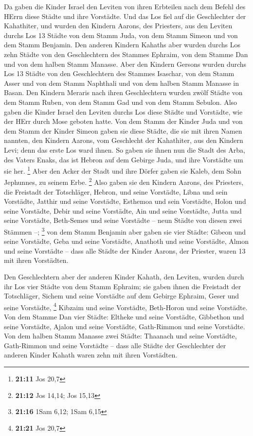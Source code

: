  Da gaben die Kinder Israel den Leviten von ihren Erbteilen
nach dem Befehl des HErrn diese Städte und ihre Vorstädte. 
Und das Los fiel auf die Geschlechter der Kahathiter, und wurden den
Kindern Aarons, des Priesters, aus den Leviten durchs Los 13 Städte von
dem Stamm Juda, von dem Stamm Simeon und von dem Stamm Benjamin.
 Den anderen Kindern Kahaths aber wurden durchs Los zehn
Städte von den Geschlechtern des Stammes Ephraim, von dem Stamme Dan und
von dem halben Stamm Manasse.  Aber den Kindern Gersons
wurden durchs Los 13 Städte von den Geschlechtern des Stammes Isaschar,
von dem Stamm Asser und von dem Stamm Naphthali und von dem halben Stamm
Manasse in Basan.  Den Kindern Meraris nach ihren
Geschlechtern wurden zwölf Städte von dem Stamm Ruben, von dem Stamm Gad
und von dem Stamm Sebulon.  Also gaben die Kinder Israel den
Leviten durchs Los diese Städte und Vorstädte, wie der HErr durch Mose
geboten hatte.  Von dem Stamm der Kinder Juda und von dem
Stamm der Kinder Simeon gaben sie diese Städte, die sie mit ihren Namen
nannten,  den Kindern Aarons, vom Geschlecht der
Kahathiter, aus den Kindern Levi; denn das erste Los ward ihnen.
 So gaben sie ihnen nun die Stadt des Arba, des Vaters
Enaks, das ist Hebron auf dem Gebirge Juda, und ihre Vorstädte um sie
her. \footnote{\textbf{21:11} Jos 20,7}  Aber den Acker der
Stadt und ihre Dörfer gaben sie Kaleb, dem Sohn Jephunnes, zu seinem
Erbe. \footnote{\textbf{21:12} Jos 14,14; Jos 15,13}  Also
gaben sie den Kindern Aarons, des Priesters, die Freistadt der
Totschläger, Hebron, und seine Vorstädte, Libna und sein Vorstädte,
 Jatthir und seine Vorstädte, Esthemoa und sein Vorstädte,
 Holon und seine Vorstädte, Debir und seine Vorstädte,
 Ain und seine Vorstädte, Jutta und seine Vorstädte,
Beth-Semes und seine Vorstädte -- neun Städte von diesen zwei Stämmen
--; \footnote{\textbf{21:16} 1Sam 6,12; 1Sam 6,15}  von dem
Stamm Benjamin aber gaben sie vier Städte: Gibeon und seine Vorstädte,
Geba und seine Vorstädte,  Anathoth und seine Vorstädte,
Almon und seine Vorstädte --  dass alle Städte der Kinder
Aarons, der Priester, waren 13 mit ihren Vorstädten.

 Den Geschlechtern aber der anderen Kinder Kahath, den
Leviten, wurden durch ihr Los vier Städte von dem Stamm Ephraim;
 sie gaben ihnen die Freistadt der Totschläger, Sichem und
seine Vorstädte auf dem Gebirge Ephraim, Geser und seine Vorstädte,
\footnote{\textbf{21:21} Jos 20,7}  Kibzaim und seine
Vorstädte, Beth-Horon und seine Vorstädte.  Von dem Stamme
Dan vier Städte: Eltheke und seine Vorstädte, Gibbethon und seine
Vorstädte,  Ajalon und seine Vorstädte, Gath-Rimmon und
seine Vorstädte.  Von dem halben Stamm Manasse zwei Städte:
Thaanach und seine Vorstädte, Gath-Rimmon und seine Vorstädte --
 dass alle Städte der Geschlechter der anderen Kinder
Kahath waren zehn mit ihren Vorstädten.

